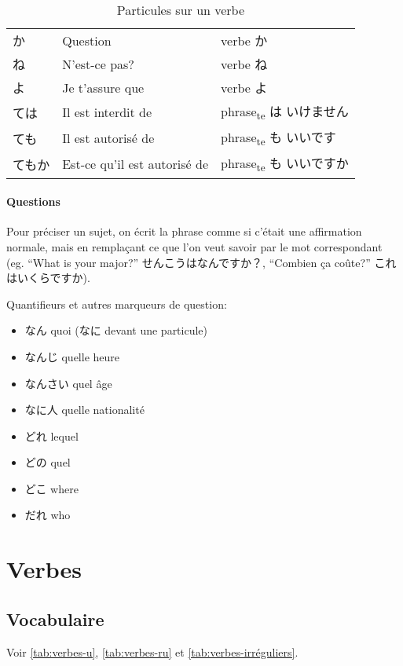 \documentclass[a4paper,10pt,french,openany]{memoir}
\begin{document}
\begin{table}[h]
 \centering
 \begin{tabular}{lll}
 か & Question & verbe か \\
 ね & N'est-ce pas? & verbe ね \\
 よ & Je t'assure que & verbe よ \\
 ては & Il est interdit de & phrase\textsubscript{te} は いけません \\
 ても & Il est autorisé de & phrase\textsubscript{te} も いいです \\
 てもか & Est-ce qu'il est autorisé de & phrase\textsubscript{te} も いいですか \\
 \end{tabular}
 \caption{Particules sur un verbe}
 \label{tab:particules-outside}
\end{table}

\paragraph{Questions}
Pour préciser un sujet, on écrit la phrase comme si c'était une affirmation normale, mais en remplaçant ce que l'on veut savoir par le mot correspondant (eg. ``What is your major?'' せんこうはなんですか？, ``Combien ça coûte?'' これはいくらですか).

Quantifieurs et autres marqueurs de question:
\begin{itemize}
 \item なん quoi (なに devant une particule)
 \item なんじ quelle heure
 \item なんさい quel âge
 \item なに人 quelle nationalité
 \item どれ lequel
 \item どの quel
 \item どこ where
 \item だれ who
\end{itemize}

\section{Verbes}

\subsection{Vocabulaire}

Voir \autoref{tab:verbes-u}, \autoref{tab:verbes-ru} et \autoref{tab:verbes-irréguliers}.
\end{document}
